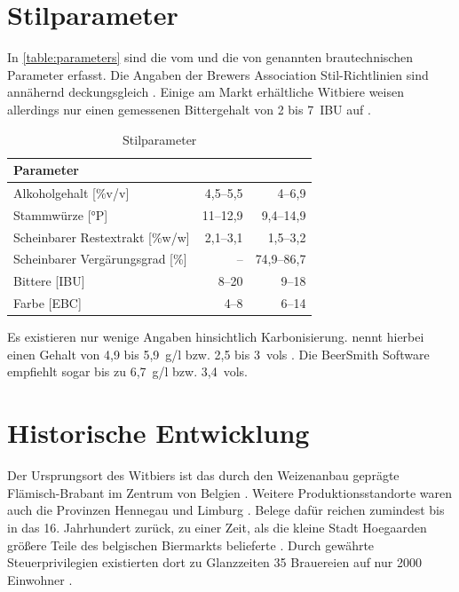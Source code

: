 \documentclass[a4paper,parskip=half]{scrartcl}
\begin{document}
\section*{Stilparameter}

In \autoref{table:parameters} sind die vom \citeauthor{BJCP2015} und die von
\citeauthor{Strottner1999} genannten brautechnischen Parameter erfasst.
Die Angaben der Brewers Association Stil-Richtlinien sind annähernd
deckungsgleich \parencites[24]{BA2021}. Einige am Markt erhältliche
Witbiere weisen allerdings nur einen gemessenen Bittergehalt von
2 bis 7~IBU auf \parencite{Roncoroni2018}.

\begin{table}[H]
\centering
\begin{tabular}{lrr}
\toprule
Parameter                    & \citeauthor{BJCP2015} & \citeauthor{Strottner1999} \\
\midrule
Alkoholgehalt [\%v/v]        & 4,5–5,5 & 4–6,9 \\
Stammwürze [°P]              & 11–12,9 & 9,4–14,9 \\
Scheinbarer Restextrakt [\%w/w] & 2,1–3,1 & 1,5–3,2 \\
Scheinbarer Vergärungsgrad [\%] & –       & 74,9–86,7 \\
Bittere [IBU]                & 8–20    & 9–18 \\
Farbe [EBC]                  & 4–8     & 6–14 \\
\bottomrule
\end{tabular}
\caption{Stilparameter \parencites[49]{BJCP2015}[23-113]{Strottner1999}}
\label{table:parameters}
\end{table}

Es existieren nur wenige Angaben hinsichtlich Karbonisierung.
\citeauthor{Zainasheff2007} nennt hierbei einen  Gehalt von
4,9 bis 5,9~g/l bzw. 2,5 bis 3~vols \parencite{Zainasheff2007}.
Die BeerSmith Software empfiehlt sogar bis zu 6,7~g/l bzw. 3,4~vols.

\section*{Historische Entwicklung}

Der Ursprungsort des Witbiers ist das durch den Weizenanbau geprägte
Flämisch-Brabant im Zentrum von Belgien \parencite[44]{Roncoroni2018}.
Weitere Produktionsstandorte waren auch die Provinzen Hennegau und
Limburg \parencite[118]{Strottner1999}.
Belege dafür reichen zumindest bis in das 16. Jahrhundert
zurück, zu einer Zeit, als die kleine Stadt Hoegaarden größere
Teile des belgischen Biermarkts belieferte \parencite[46]{Mulder2020}. 
Durch gewährte Steuerprivilegien existierten dort zu Glanzzeiten 35
Brauereien auf nur 2000 Einwohner \parencite[27]{Sparrow2002}.
\end{document}
